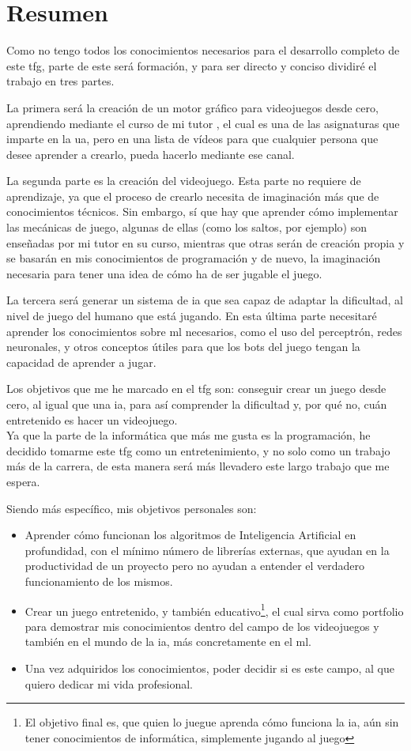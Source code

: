 \chapter*{Resumen}
Como no tengo todos los conocimientos necesarios para el desarrollo completo de este \gls{tfg}, parte de este será formación, y para ser directo y conciso dividiré el trabajo en tres partes.

La primera será la creación de un motor gráfico para videojuegos desde cero, aprendiendo mediante el curso de mi tutor \cite{CursoMotorC++}, el cual es una de las asignaturas que imparte en la \gls{ua}, pero en una lista de vídeos para que cualquier persona que desee aprender a crearlo, pueda hacerlo mediante ese canal.

La segunda parte es la creación del videojuego. Esta parte no requiere de aprendizaje, ya que el proceso de crearlo necesita de imaginación más que de conocimientos técnicos. Sin embargo, sí que hay que aprender cómo implementar las mecánicas de juego, algunas de ellas (como los saltos, por ejemplo) son enseñadas por mi tutor en su curso, mientras que otras serán de creación propia y se basarán en mis conocimientos de programación y de nuevo, la imaginación necesaria para tener una idea de cómo ha de ser jugable el juego.

La tercera será generar un sistema de \gls{ia} que sea capaz de adaptar la dificultad, al nivel de juego del humano que está jugando. En esta última parte necesitaré aprender los conocimientos sobre \gls{ml} necesarios, como el uso del perceptrón, redes neuronales, y otros conceptos útiles para que los bots del juego tengan la capacidad de aprender  a jugar.

Los objetivos que me he marcado en el \gls{tfg} son: conseguir crear un juego desde cero, al igual que una \gls{ia}, para así comprender la dificultad y, por qué no, cuán entretenido es hacer un videojuego. 
\\
Ya que la parte de la informática que más me gusta es la programación, he decidido tomarme este \gls{tfg} como un entretenimiento, y no solo como un trabajo más de la carrera, de esta manera será más llevadero este largo trabajo que me espera.

Siendo más específico, mis objetivos personales son:
\begin{itemize}
    \item Aprender cómo funcionan los algoritmos de Inteligencia Artificial en profundidad, con el mínimo número de librerías externas, que ayudan en la productividad de un proyecto pero no ayudan a entender el verdadero funcionamiento de los mismos.
    \item Crear un juego entretenido, y también educativo\footnote{El objetivo final es, que quien lo juegue aprenda cómo funciona la \gls{ia}, aún sin tener conocimientos de informática, simplemente jugando al juego}, el cual sirva como portfolio para demostrar mis conocimientos dentro del campo de los videojuegos y también en el mundo de la \gls{ia}, más concretamente en el \gls{ml}.
    \item Una vez adquiridos los conocimientos, poder decidir si es este campo, al que quiero dedicar mi vida profesional.
\end{itemize}


